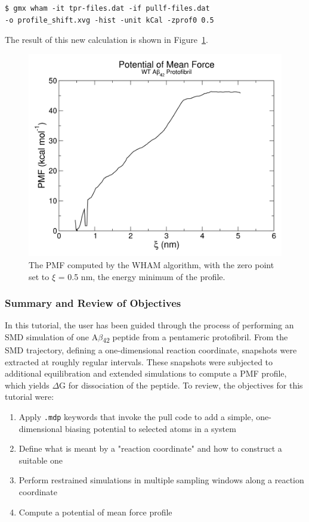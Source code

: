 \documentclass[9pt,tutorial]{livecoms}
\begin{document}
\begin{verbatim}
$ gmx wham -it tpr-files.dat -if pullf-files.dat 
-o profile_shift.xvg -hist -unit kCal -zprof0 0.5
\end{verbatim}

The result of this new calculation is shown in Figure~\ref{umbrella_pmf_shift_fig}.

\begin{figure}[h!]
\centering
\includegraphics{umbrella_pmf_shift}
\caption{The PMF computed by the WHAM algorithm, with the zero point set to $\xi$ = 0.5 nm, the energy minimum of the profile.}
\label{umbrella_pmf_shift_fig}
\end{figure}

\subsubsection{Summary and Review of Objectives} \label{umbrella_summary}

In this tutorial, the user has been guided through the process of performing an SMD simulation of one A$\beta$\textsubscript{42} peptide from a pentameric protofibril. From the SMD trajectory, defining a one-dimensional reaction coordinate, snapshots were extracted at roughly regular intervals. These snapshots were subjected to additional equilibration and extended simulations to compute a PMF profile, which yields $\Delta$G for dissociation of the peptide. To review, the objectives for this tutorial were:

\begin{enumerate}
	\item Apply \texttt{.mdp} keywords that invoke the pull code to add a simple, one-dimensional biasing potential to selected atoms in a system
	\item Define what is meant by a "reaction coordinate" and how to construct a suitable one
	\item Perform restrained simulations in multiple sampling windows along a reaction coordinate
	\item Compute a potential of mean force profile
\end{enumerate}
\end{document}
